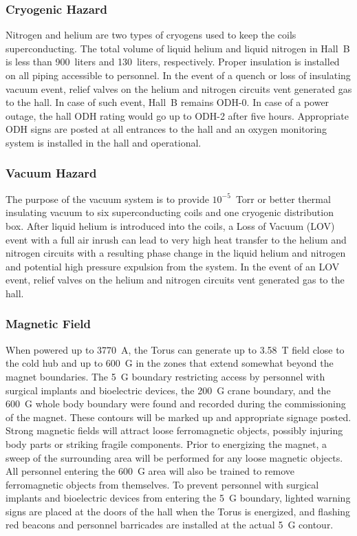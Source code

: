 \subsubsection{Cryogenic Hazard}

Nitrogen and helium are two types of cryogens used to keep the coils superconducting. The 
total volume of liquid helium and liquid nitrogen in Hall~B is less than 900~liters and 
130~liters, respectively. Proper insulation is installed on all piping accessible to 
personnel. In the event of a quench or loss of insulating vacuum event, relief valves on 
the helium and nitrogen circuits vent generated gas to the hall. In case of such event, 
Hall~B remains ODH-0. In case of a power outage, the hall ODH rating would go up to ODH-2 
after five hours. Appropriate ODH signs are posted at all entrances to the hall and an 
oxygen monitoring system is installed in the hall and operational.

\subsubsection{Vacuum Hazard}

The purpose of the vacuum system is to provide $10^{-5}$~Torr or better thermal insulating 
vacuum to six superconducting coils and one cryogenic distribution box. After liquid helium 
is introduced into the coils, a Loss of Vacuum (LOV) event with a full air inrush can lead to
very high heat transfer to the helium and nitrogen circuits with a resulting phase change in 
the liquid helium and nitrogen and potential high pressure expulsion from the system. In the 
event of an LOV event, relief valves on the helium and nitrogen circuits vent generated
gas to the hall.

\subsubsection{Magnetic Field}

When powered up to 3770~A, the Torus can generate up to 3.58~T field close to the cold hub 
and up to 600~G in the zones that extend somewhat beyond the magnet boundaries. The 5~G 
boundary restricting access by personnel with surgical implants and bioelectric devices, the
200~G crane boundary, and the 600~G whole body boundary were found and recorded during the 
commissioning of the magnet. These contours will be marked up and appropriate signage posted.
Strong magnetic fields will attract loose ferromagnetic objects, possibly injuring body parts 
or striking fragile components. Prior to energizing the magnet, a sweep of the surrounding 
area will be performed for any loose magnetic objects. All personnel entering the 600~G area 
will also be trained to remove ferromagnetic objects from themselves. To prevent personnel with 
surgical implants and bioelectric devices from entering the 5~G boundary, lighted warning signs 
are placed at the doors of the hall when the Torus is energized, and flashing red beacons
and personnel barricades are installed at the actual 5~G contour.

